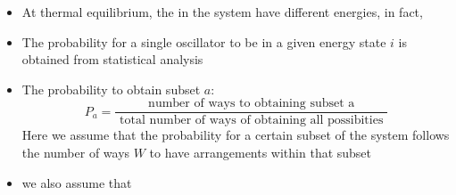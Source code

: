 \begin{frame}
\frametitle{\texorpdfstring{\culine[\sectiontitleulinecolor]{\sectiontitle}}{\sectiontitle} }

\begin{itemize}
	\item At thermal equilibrium, the  in the system have different energies, in fact, 

\item The probability for a single oscillator to be in a given energy state $i$ is obtained from statistical analysis 

\item The probability to obtain subset $a$:
\[
P_{a}=\frac{\text { number of ways to obtaining subset a }}{\text { total number of ways of obtaining all possibities }}
\]
Here we assume that the probability for a certain subset of the system follows the number of ways $W$ to have arrangements within that subset 

\item we also assume that  
%
\end{itemize}

\endofslide 
\end{frame}

